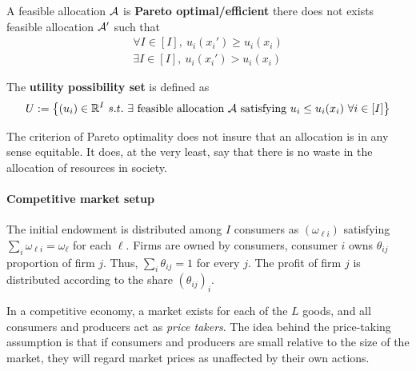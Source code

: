 \documentclass{report}
\begin{document}
	 	\begin{definition}[1.B.2]
	 		A feasible allocation $\mathcal{{A}}$ is \textbf{Pareto optimal/efficient} there does not exists feasible allocation $\mathcal{{A}}'$ such that
	 		\begin{gather}
	 			\forall I \in [I],\ u_i(x_i') \geq u_i(x_i)\\
	 			\exists I \in [I],\ u_i(x_i') > u_i(x_i)
	 		\end{gather}
	 	\end{definition}
	 	
	 	\begin{definition}
	 		The \textbf{utility possibility set} is defined as 
	 		\begin{equation}
	 			U := \left \{
	 				(u_i) \in \R^I\ s.t.\ 
	 				\exists \tx{ feasible allocation } \mc{A} \tx{ satisfying } 
	 				u_i \leq u_i(x_i)\ \forall i \in [I]
	 			\right \}
	 		\end{equation}
	 	\end{definition}
	 	
	 	\begin{remark}
	 		The criterion of Pareto optimality does not insure that an allocation is in any sense equitable. It does, at the very least, say that there is no waste in the allocation of resources in society.
	 	\end{remark}
	 	
	 	\paragraph{Competitive market setup} The initial endowment is distributed among $I$ consumers as $(\omega_{\ell i})$ satisfying $\sum_i \omega_{\ell i} = \omega_\ell$ for each $\ell$. Firms are owned by consumers, consumer $i$ owns $\theta_{ij}$ proportion of firm $j$. Thus, $\sum_{i} \theta_{ij} = 1$ for every $j$. The profit of firm $j$ is distributed according to the share $(\theta_{ij})_i$.
	 	
	 	\begin{assumption}
	 		In a competitive economy, a market exists for each of the $L$ goods, and all consumers and producers act as \emph{price takers}. The idea behind the price-taking assumption is that if consumers and producers are small relative to the size of the market, they will regard market prices as unaffected by their own actions.
	 	\end{assumption}
	 	
\end{document}
